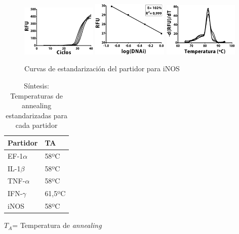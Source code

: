 \documentclass[12pt,letterpaper,oneside]{scrbook}
\begin{document}
\begin{figure}[h!]
\centering
        {\includegraphics[width=0.32\textwidth]{standarization/inos/ampl}}
        {\includegraphics[width=0.32\textwidth]{standarization/inos/stand}}
        {\includegraphics[width=0.32\textwidth]{standarization/inos/melting}}
        \caption{Curvas de estandarización del partidor para iNOS}
    \label {fig:inos}
\end{figure}

\begin{table}[h!]
    \centering
    \begin{threeparttable}
        \caption{Síntesis: Temperaturas de annealing estandarizadas para cada partidor} \label{tabla:sintesispartidores}
        \begin{tabularx}{0.5\textwidth}{X l}
            \toprule
            Partidor & TA \\
            \midrule
            EF-1$\alpha$ & 58ºC \\
            IL-1$\beta$ & 58ºC \\
            TNF-$\alpha$ & 58ºC \\
            IFN-$\gamma$ & 61,5ºC \\
            iNOS & 58ºC \\
            \bottomrule
        \end{tabularx}
    \begin{tablenotes}
        \item $T_A$= Temperatura de \emph{annealing}
    \end{tablenotes}
    \end{threeparttable}
\end{table}
\end{document}
